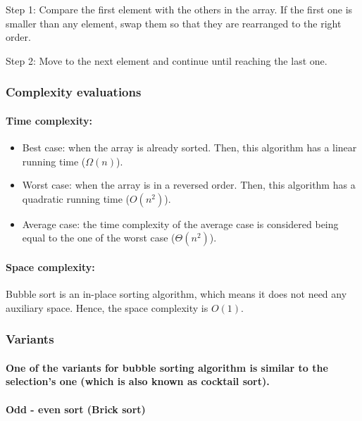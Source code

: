 \documentclass{article}
\newcommand\tab[1][0.5cm]{\hspace*{#1}}
\begin{document}
\tab Step 1: Compare the first element with the others in the array. If the first one is smaller than any element, swap them so that they are rearranged to the right order.
\smallskip

Step 2: Move to the next element and continue until reaching the last one.

\subsubsection{Complexity evaluations}

\paragraph{\tab Time complexity:}

\begin{itemize}
    \item Best case: when the array is already sorted. Then, this algorithm has a linear running time ($\Omega(n)$).
    
    \item Worst case: when the array is in a reversed order. Then, this algorithm has a quadratic running time ($O(n^2)$).
    
    \item Average case: the time complexity of the average case is considered being equal to the one of the worst case ($\Theta(n^2)$).
    
\end{itemize}

\paragraph{\tab Space complexity:}

Bubble sort is an in-place sorting algorithm, which means it does not need any auxiliary space. Hence, the space complexity is $O(1)$.
    
\subsubsection{Variants}

\paragraph{One of the variants for bubble sorting algorithm is similar to the selection's one (which is also known as cocktail sort).}

\paragraph{Odd - even sort (Brick sort)}
\end{document}
